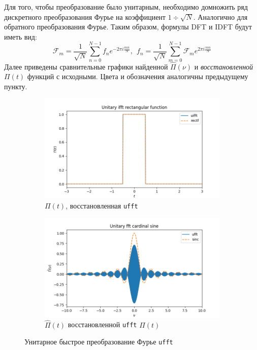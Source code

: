 \documentclass[a4paper, 12pt]{article}
\begin{document}
    Для того, чтобы преобразование было унитарным, необходимо домножить ряд дискретного преобразования Фурье
    на коэффициент $1\div\sqrt{N}$. Аналогично для обратного преобразования Фурье. Таким образом, формулы DFT и IDFT будут
    иметь вид:
    $$
    \mathcal{F}_m = \dfrac{1}{\sqrt{N}}\sum\limits_{n=0}^{N-1}f_ne^{-2\pi i \frac{mn}{N}},\ \ f_n=\dfrac{1}{\sqrt{N}}\sum\limits_{m=0}^{N-1}\mathcal{F}_me^{2\pi i\frac{mn}{N}}
    $$
    Далее приведены сравнительные графики найденной $\hat{\Pi}(\nu)$ и \textit{восстановленной} $\Pi(t)$ функций с исходными. Цвета и обозначения аналогичны предыдущему пункту.
    \begin{figure}[H]
        \centering
        \begin{subfigure}{0.45\textwidth}
            \centering
            \includegraphics[width=\linewidth]{uifft.png}
            \caption{$\Pi(t)$, восстановленная \texttt{ufft}}
            \label{fig:uifft}
        \end{subfigure}
        \hspace{5mm}
        \begin{subfigure}{0.45\textwidth}
            \centering
            \includegraphics[width=\linewidth]{ufft.png}
            \caption{$\hat{\Pi}(t)$ восстановленной \texttt{ufft} $\Pi(t)$}
            \label{fig:ufft}
        \end{subfigure}
        \caption{Унитарное быстрое преобразование Фурье \texttt{ufft}}
        \label{fig:uffts}
    \end{figure}
\end{document}
